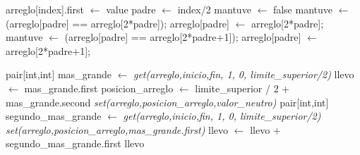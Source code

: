 \begin{algorithmic}
	\State arreglo[index].first $\gets$ value
	\State padre $\gets$ index/2
	\State mantuve $\gets$ false
		 	\State mantuve $\gets$ (arreglo[padre] == arreglo[2*padre]);
			\State arreglo[padre] $\gets$ arreglo[2*padre]; 	
		\Else
			\State mantuve $\gets$ (arreglo[padre] == arreglo[2*padre+1]);
		 	\State arreglo[padre] $\gets$ arreglo[2*padre+1];
		\EndIf
	\EndWhile 
\EndFunction
\end{algorithmic}
\hspace{.5cm}

\begin{algorithmic}

	\State pair[int,int] mas_grande $\gets$ \textit{get(arreglo,inicio,fin, 1, 0, limite_superior/2)} 
	\State llevo $\gets$ mas_grande.first
	\State posicion_arreglo $\gets$ limite_superior / 2 + mas_grande.second
	\State \textit{set(arreglo,posicion_arreglo,valor_neutro)} 
	\State pair[int,int] segundo_mas_grande $\gets$ \textit{get(arreglo,inicio,fin, 1, 0, limite_superior/2)} 
	\State \textit{set(arreglo,posicion_arreglo,mas_grande.first)} 
	\State llevo $\gets$ llevo + segundo_mas_grande.first 
	\State \Return llevo

\EndFunction
\end{algorithmic}
\hspace{.5cm}

